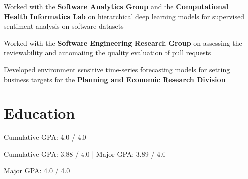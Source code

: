 \documentclass[]{Achyudh_Resume}
\begin{document}
\begin{minipage}[t]{0.655\textwidth}
Worked with the \textbf{Software Analytics Group} and the \textbf{Computational Health Informatics Lab} on hierarchical deep learning models for supervised sentiment analysis on software datasets
\sectionsep

Worked with the \textbf{Software Engineering Research Group} on assessing the reviewability and automating the quality evaluation of pull requests
\sectionsep

Developed environment sensitive time-series forecasting models for setting business targets for the \textbf{Planning and Economic Research Division}
\sectionsep


\section{Education} 

\vspace{\topsep}
\begin{tightemize}
\item[]
Cumulative GPA: 4.0 / 4.0
\end{tightemize}

\sectionsep

\begin{tightemize}
\item[] 
Cumulative GPA: 3.88 / 4.0 | Major GPA: 3.89 / 4.0
\halfsectionsep
\item[] 
Major GPA: 4.0 / 4.0
\end{tightemize}
\end{minipage} 

\end{document}
